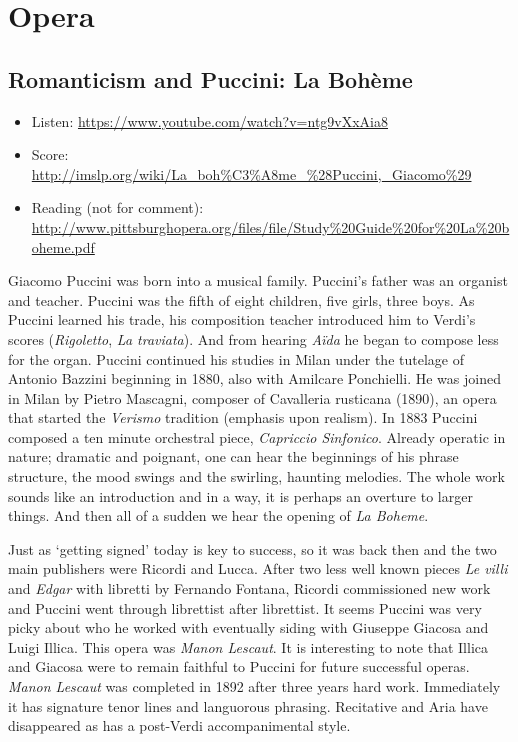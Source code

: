 
\chapter{Opera}
\label{opera}


\section{Romanticism and Puccini: La Boh\`eme}
\begin{itemize}
\item Listen: \url{https://www.youtube.com/watch?v=ntg9vXxAia8}
\item Score: \url{http://imslp.org/wiki/La_boh%C3%A8me_%28Puccini,_Giacomo%29}
\item Reading (not for comment): \url{http://www.pittsburghopera.org/files/file/Study%20Guide%20for%20La%20boheme.pdf}
\end{itemize}

Giacomo Puccini was born into a musical family. Puccini's father was an organist and teacher. Puccini was the fifth of eight children, five girls, three boys. As Puccini learned his trade, his composition teacher introduced him to Verdi's scores (\textit{Rigoletto}, \textit{La traviata}). And from hearing \textit{A\"ida} he began to compose less for the organ. Puccini continued his studies in Milan under the tutelage of Antonio Bazzini beginning in 1880, also with Amilcare Ponchielli. He was joined in Milan by Pietro Mascagni, composer of Cavalleria rusticana (1890), an opera that started the \textit{Verismo} tradition (emphasis upon realism). In 1883 Puccini composed a ten minute orchestral piece, \textit{Capriccio Sinfonico}. Already operatic in nature; dramatic and poignant, one  can hear the beginnings of his phrase structure, the mood swings and the swirling, haunting melodies. The whole work sounds like an introduction and in a way, it is perhaps an overture to larger things. And then all of a sudden we hear the opening of \textit{La Boheme}. 

Just as `getting signed' today is key to success, so it was back then and the two main publishers were Ricordi and Lucca. After two less well known pieces \textit{Le villi} and \textit{Edgar} with libretti by Fernando Fontana, Ricordi commissioned new work and Puccini went through librettist after librettist. It seems Puccini was very picky about who he worked with eventually siding with Giuseppe Giacosa and Luigi Illica. This opera was \textit{Manon Lescaut}. It is interesting to note that Illica and Giacosa were to remain faithful to Puccini for future successful operas. \textit{Manon Lescaut} was completed in 1892 after three years hard work. Immediately it has signature tenor lines and languorous phrasing. Recitative and Aria have disappeared as has a post-Verdi accompanimental style. 

